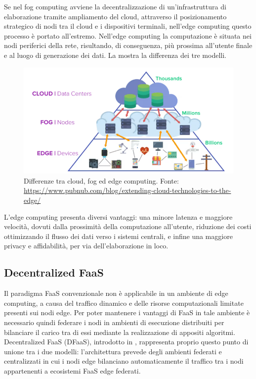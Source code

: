 Se nel fog computing avviene la decentralizzazione di un’infrastruttura di elaborazione tramite ampliamento del cloud, attraverso il posizionamento strategico di nodi tra il cloud e i dispositivi terminali, nell'edge computing questo processo è portato all'estremo. Nell'edge computing la computazione è situata nei nodi periferici della rete, risultando, di conseguenza, più prossima all'utente finale e al luogo di generazione dei dati. La  mostra la differenza dei tre modelli.

\begin{figure}
    \centering
    \includegraphics[width=.8\linewidth]{assets/2/cloud_fog_edge.png}
    \caption[Differenze tra cloud, fog ed edge computing]{Differenze tra cloud, fog ed edge computing. Fonte: \url{https://www.pubnub.com/blog/extending-cloud-technologies-to-the-edge/}}
    \label{fig:2_cloud_fog_edge}
\end{figure}

L'edge computing presenta diversi vantaggi: una minore latenza e maggiore velocità, dovuti dalla prossimità della computazione all'utente, riduzione dei costi ottimizzando il flusso dei dati verso i sistemi centrali, e infine una maggiore privacy e affidabilità, per via dell'elaborazione in loco.

\subsection{Decentralized FaaS}
\label{sec:2_dfaas}

Il paradigma FaaS convenzionale non è applicabile in un ambiente di edge computing, a causa del traffico dinamico e delle risorse computazionali limitate presenti sui nodi edge. Per poter mantenere i vantaggi di FaaS in tale ambiente è necessario quindi federare i nodi in ambienti di esecuzione distribuiti per bilanciare il carico tra di essi mediante la realizzazione di appositi algoritmi. Decentralized FaaS (DFaaS), introdotto in \cite{Ciavotta2021}, rappresenta proprio questo punto di unione tra i due modelli: l'architettura prevede degli ambienti federati e centralizzati in cui i nodi edge bilanciano automaticamente il traffico tra i nodi appartenenti a ecosistemi FaaS edge federati.

